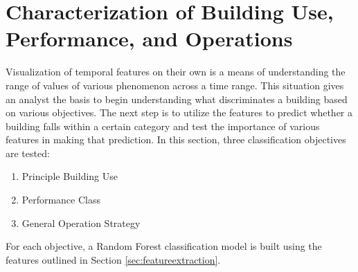 \section{Characterization of Building Use, Performance, and Operations}
\label{sec:characterization}

Visualization of temporal features on their own is a means of understanding the range of values of various phenomenon across a time range. This situation gives an analyst the basis to begin understanding what discriminates a building based on various objectives. The next step is to utilize the features to predict whether a building falls within a certain category and test the importance of various features in making that prediction. In this section, three classification objectives are tested: 

\begin{enumerate}
\item Principle Building Use
\item Performance Class
\item General Operation Strategy
\end{enumerate}

For each objective, a Random Forest classification model is built using the features outlined in Section \ref{sec:featureextraction}.

